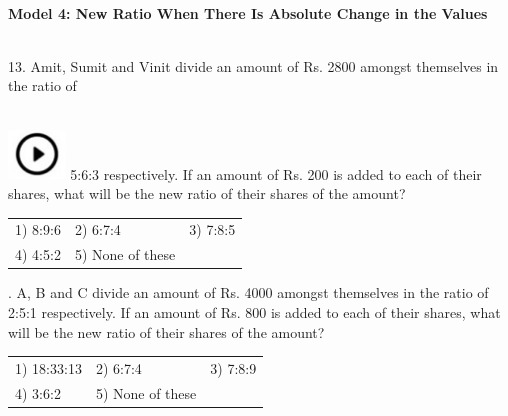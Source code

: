 \documentclass{article}
\begin{document}
	\noindent 
	
	\noindent 
	
	\noindent \\   \textbf{Model 4: New Ratio When There Is Absolute Change in the Values}
	
	\noindent 
	
	\noindent 
	
	\noindent \\   13. Amit, Sumit and Vinit divide an amount of Rs. 2800 amongst themselves in the ratio of
	
	\noindent 
	
	\noindent  
	\noindent \\ \includegraphics*[width=0.60in, height=0.52in]{images/image1} 5:6:3 respectively. If an amount of Rs. 200 is added to each of their shares, what will be the new ratio of their shares of the amount?
	
	\noindent 
	
	\noindent \begin{tabular}{p{1.7in} p{1.6in} p{1.6in}} \\ 
 1) 8:9:6                    &  2) 6:7:4             &  3) 7:8:5             \\
4) 4:5:2             & 5) None of these  \\
\end{tabular}
	
	\noindent 
	
	\noindent 
	
	\noindent 
	\newpage
	. A, B and C divide an amount of Rs. 4000 amongst themselves in the ratio of 2:5:1 respectively. If an amount of Rs. 800 is added to each of their shares, what will be the new ratio of their shares of the amount?
	
	\noindent \begin{tabular}{p{1.7in} p{1.6in} p{1.6in}} \\ 
 1) 18:33:13              &  2) 6:7:4             &  3) 7:8:9             \\
4) 3:6:2             & 5) None of these  \\
\end{tabular}
	
	\noindent 
	
	\noindent 
	
	\noindent 
	
\end{document}
